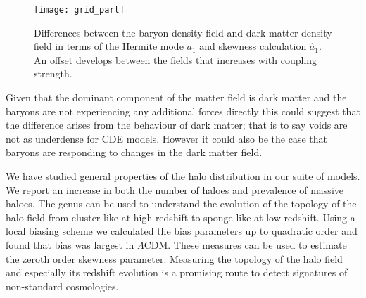 \begin{figure}
	\centering
	\texttt{[image: grid\_part]}
    \caption{Differences between the baryon density field and dark matter density field in terms of the Hermite mode $\tilde{a}_1$ and skewness calculation $\hat{a}_1$. An offset develops between the fields that increases with coupling strength.}
    \label{fig:baryons}
\end{figure}
Given that the dominant component of the matter field is dark matter and the baryons are not experiencing any additional forces directly this could suggest that the difference arises from the behaviour of dark matter; that is to say voids are not as underdense for CDE models. However it could also be the case that baryons are responding to changes in the dark matter field.


We have studied general properties of the halo distribution in our suite of models. We report an increase in both the number of haloes and prevalence of massive haloes. The genus can be used to understand the evolution of the topology of the halo field from cluster-like at high redshift to sponge-like at low redshift. Using a local biasing scheme we calculated the bias parameters up to quadratic order and found that bias was largest in $\Lambda$CDM. These measures can be used to estimate the zeroth order skewness parameter. Measuring the topology of the halo field and especially its redshift evolution is a promising route to detect signatures of non-standard cosmologies.












